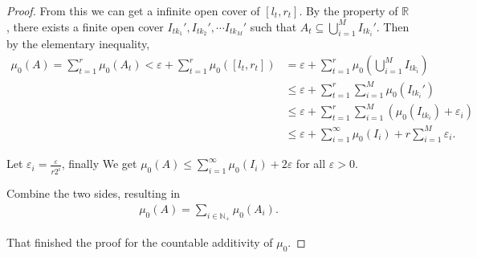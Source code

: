 \begin{proof}[Proof]
    From this we can get a infinite open cover of $[l_t, r_t]$. By the property of $\mathbb{R} $, there exists a finite open cover $I_{tk_1}', I_{tk_2}',\cdots I_{tk_M}'$ such that $A_t \subseteq \bigcup_{i=1}^M I_{tk_i}'$. Then by the elementary inequality, 
    \begin{align*}
        \mu_0(A) = \sum_{t=1}^r \mu_0(A_t) < \varepsilon + \sum_{t=1}^r \mu_0([l_t, r_t]) &= \varepsilon + \sum_{t=1}^r \mu_0(\bigcup_{i=1}^M I_{tk_i}) \\
                                                                                          &\le \varepsilon + \sum_{t=1}^r \sum_{i=1}^M \mu_0(I_{tk_i}')  \\
                                                                                          &\le \varepsilon + \sum_{t=1}^r \sum_{i=1}^M (\mu_0(I_{tk_i}) + \varepsilon_i)  \\
                                                                                          &\le \varepsilon + \sum_{i=1}^\infty \mu_0(I_i) + r\sum_{i=1}^M \varepsilon_i
   .\end{align*}

   Let $\varepsilon _i = \frac{\varepsilon}{r2^i}$, finally We get $\mu_0(A) \le \sum _{i=1}^\infty \mu_0(I_i) + 2\varepsilon $ for all $\varepsilon > 0$.

   Combine the two sides, resulting in 
    \begin{align*}
        \mu_0(A) = \sum _{i\in\mathbb{N} _+} \mu_0(A_i)
    .\end{align*}

    That finished the proof for the countable additivity of $\mu_0$.

\end{proof}



